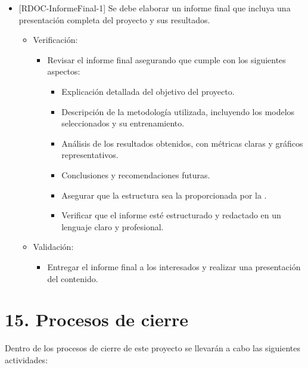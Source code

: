 \documentclass[
11pt, %
]{charter}
\begin{document}
\begin{itemize}[label={}]
  \item {[}RDOC-InformeFinal-1{]} Se debe elaborar un informe final que incluya una presentación completa del proyecto y sus resultados.
        \begin{itemize}
          \item Verificación:
                \begin{itemize}
                  \item Revisar el informe final asegurando que cumple con los siguientes aspectos:
                        \begin{itemize}
                          \item Explicación detallada del objetivo del proyecto.
                          \item Descripción de la metodología utilizada, incluyendo los modelos seleccionados y su entrenamiento.
                          \item Análisis de los resultados obtenidos, con métricas claras y gráficos representativos.
                          \item Conclusiones y recomendaciones futuras.
                          \item Asegurar que la estructura sea la proporcionada por la \pertesupname.
                          \item Verificar que el informe esté estructurado y redactado en un lenguaje claro y profesional.
                        \end{itemize}
                \end{itemize}
          \item Validación:
                \begin{itemize}
                  \item Entregar el informe final a los interesados y realizar una presentación del contenido.
                \end{itemize}
        \end{itemize}
\end{itemize}

\section{15. Procesos de cierre}
\label{sec:cierre}

Dentro de los procesos de cierre de este proyecto se llevarán a cabo las siguientes actividades:
\end{document}
